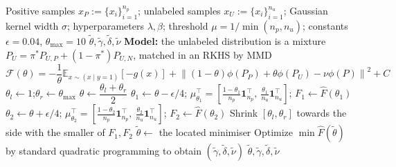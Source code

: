 \documentclass{article}
\begin{document}
\begin{algorithm}[!h]
\renewcommand{\algorithmicrequire}{\textbf{Input:}}
\renewcommand{\algorithmicensure}{\textbf{Output:}}
	\caption{CAPU (class-prior approximation jointly with PU classification)}
	\begin{algorithmic}[1]
	    \REQUIRE
	    Positive samples $x_{P}:=\{x_{i}\}_{i=1}^{n_{p}}$; unlabeled samples
	    $x_{U}:=\{x_{i}\}_{i=1}^{n_{u}}$;
	    Gaussian kernel width $\sigma$; hyperparameters $\lambda,\beta$;
	    threshold $\mu=1/\min(n_{p},n_{u})$; constants $\epsilon=0.04$, $\theta_{\max}=10$
	    \ENSURE
	    $\tilde{\theta},\tilde{\gamma},\tilde{\delta},\tilde{\nu}$
	    \STATE \textbf{Model:} the unlabeled distribution is a mixture
	    $P_{U}=\pi^{\ast}P_{U,P}+(1-\pi^{\ast})P_{U,N}$, matched in an RKHS by MMD %
	    \STATE \quad $\mathcal{F}(\theta)=-\dfrac{1}{\theta}\mathbb{E}_{x\sim(x\mid y=1)}[-g(x)]
	    +\left\|(1-\theta)\phi(P_{P})+\theta\phi(P_{U})-\nu\phi(P)\right\|^{2}+C$ %
	    \STATE $\theta_{l}\leftarrow 1$;\quad $\theta_{r}\leftarrow \theta_{\max}$
	    \STATE $\theta\leftarrow \dfrac{\theta_{l}+\theta_{r}}{2}$
	    \STATE $\theta_{1}\leftarrow \theta-\epsilon/4$;\quad
	    $\mu_{\theta_{1}}^{\top}=\left[\tfrac{1-\theta_{1}}{n_{p}}\mathbf{1}_{n_{p}}^{\top},\ \tfrac{\theta_{1}}{n_{u}}\mathbf{1}_{n_{u}}^{\top}\right]$;\quad
	    $F_{1}\leftarrow \hat{F}(\theta_{1})$
	    \STATE $\theta_{2}\leftarrow \theta+\epsilon/4$;\quad
	    $\mu_{\theta_{2}}^{\top}=\left[\tfrac{1-\theta_{2}}{n_{p}}\mathbf{1}_{n_{p}}^{\top},\ \tfrac{\theta_{2}}{n_{u}}\mathbf{1}_{n_{u}}^{\top}\right]$;\quad
	    $F_{2}\leftarrow \hat{F}(\theta_{2})$
	    \STATE Shrink $[\theta_{l},\theta_{r}]$ towards the side with the smaller of $F_{1},F_{2}$ %
	    \ENDWHILE
	    \STATE $\tilde{\theta}\leftarrow$ the located minimiser
	    \STATE Optimize $\min\hat{F}(\tilde{\theta})$ by standard quadratic programming
	    to obtain $(\tilde{\gamma},\tilde{\delta},\tilde{\nu})$ %
		\RETURN $\tilde{\theta},\tilde{\gamma},\tilde{\delta},\tilde{\nu}$
	\end{algorithmic}
\end{algorithm}
\end{document}
